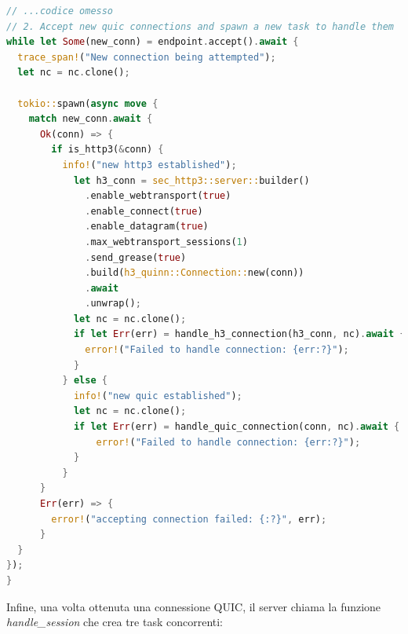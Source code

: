 \documentclass{article}
\begin{document}
\begin{lstlisting}[language=Rust, style=boxed, label={lst:server-loop}, captionpos=b,caption={Loop del server UDP}]
// ...codice omesso
// 2. Accept new quic connections and spawn a new task to handle them
while let Some(new_conn) = endpoint.accept().await {
  trace_span!("New connection being attempted");
  let nc = nc.clone();

  tokio::spawn(async move {
    match new_conn.await {
      Ok(conn) => {
        if is_http3(&conn) {
          info!("new http3 established");
            let h3_conn = sec_http3::server::builder()
              .enable_webtransport(true)
              .enable_connect(true)
              .enable_datagram(true)
              .max_webtransport_sessions(1)
              .send_grease(true)
              .build(h3_quinn::Connection::new(conn))
              .await
              .unwrap();
            let nc = nc.clone();
            if let Err(err) = handle_h3_connection(h3_conn, nc).await {
              error!("Failed to handle connection: {err:?}");
            }
          } else {
            info!("new quic established");
            let nc = nc.clone();
            if let Err(err) = handle_quic_connection(conn, nc).await {
                error!("Failed to handle connection: {err:?}");
            }
          }
      }
      Err(err) => {
        error!("accepting connection failed: {:?}", err);
      }
  }
});
}

\end{lstlisting}
Infine, una volta ottenuta una connessione QUIC, il server chiama la funzione 
\textit{handle\_session} che crea tre task concorrenti:
\end{document}
